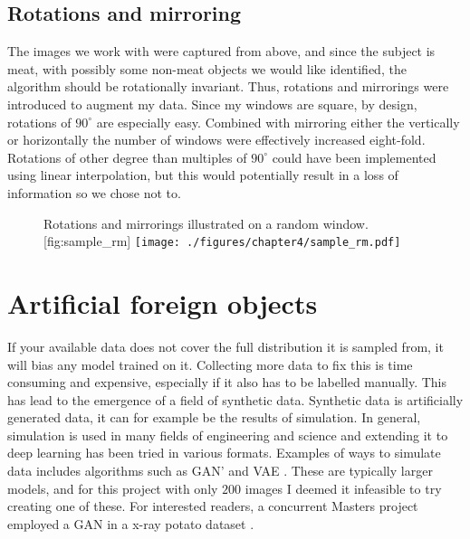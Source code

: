 \subsection{Rotations and mirroring}
The images we work with were captured from above, and since the subject is meat, with possibly some non-meat objects we would like identified, the algorithm should be rotationally invariant. 
Thus, rotations and mirrorings were introduced to augment my data. 
Since my windows are square, by design, rotations of $90^\circ$ are especially easy.
Combined with mirroring either the vertically or horizontally the number of windows were effectively increased eight-fold.
Rotations of other degree than multiples of $90^\circ$ could have been implemented using linear interpolation, but this would potentially result in a loss of information so we chose not to.

\begin{figure}[h]
	\begin{sidecaption}{Rotations and mirrorings illustrated on a random window.}[fig:sample_rm]
		\centering
		\texttt{[image: ./figures/chapter4/sample\_rm.pdf]}
	\end{sidecaption}
\end{figure}

\section{Artificial foreign objects}
\label{sec:afo}
If your available data does not cover the full distribution it is sampled from, it will bias any model trained on it.
Collecting more data to fix this is time consuming and expensive, especially if it also has to be labelled manually. 
This has lead to the emergence of a field of synthetic data. \cite{dwibediCutPasteLearn2017}
Synthetic data is artificially generated data, it can for example be the results of simulation.
In general, simulation is used in many fields of engineering and science and extending it to deep learning has been tried in various formats. 
Examples of ways to simulate data includes algorithms such as \ac{GAN}' \cite{goodfellowGenerativeAdversarialNets} and \ac{VAE} \cite{kingmaAutoEncodingVariationalBayes2014}.
These are typically larger models, and for this project with only $200$ images I deemed it infeasible to try creating one of these. 
For interested readers, a concurrent Masters project employed a \ac{GAN} in a x-ray potato dataset \cite{johannessonGeneratingRealisticArtificial}.

